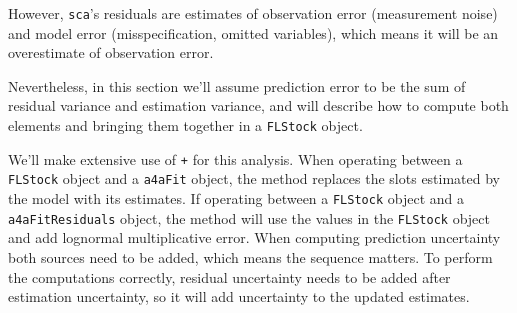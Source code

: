 \documentclass[
]{book}
\begin{document}
However, \texttt{sca}'s residuals are estimates of observation error (measurement noise) and model error (misspecification, omitted variables), which means it will be an overestimate of observation error.

Nevertheless, in this section we'll assume prediction error to be the sum of residual variance and estimation variance, and will describe how to compute both elements and bringing them together in a \texttt{FLStock} object.

We'll make extensive use of \texttt{+} for this analysis. When operating between a \texttt{FLStock} object and a \texttt{a4aFit} object, the method replaces the slots estimated by the model with its estimates. If operating between a \texttt{FLStock} object and a \texttt{a4aFitResiduals} object, the method will use the values in the \texttt{FLStock} object and add lognormal multiplicative error. When computing prediction uncertainty both sources need to be added, which means the sequence matters. To perform the computations correctly, residual uncertainty needs to be added after estimation uncertainty, so it will add uncertainty to the updated estimates.
\end{document}
